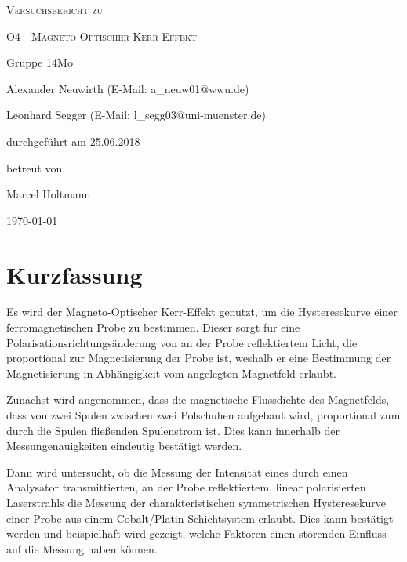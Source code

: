 \documentclass[
	a4paper,
	12pt,
	pagesize,
	ngerman
]{scrartcl}
\begin{document}
	
	\begin{titlepage}
		\centering
		{\scshape\LARGE Versuchsbericht zu \par}
		\vspace{1cm}
		{\scshape\huge O4 - Magneto-Optischer Kerr-Effekt \par}
		\vspace{2.5cm}
		{\LARGE Gruppe 14Mo \par}
		\vspace{0.5cm}
		
		{\large Alexander Neuwirth (E-Mail: a\_neuw01@wwu.de) \par}
		{\large Leonhard Segger (E-Mail: l\_segg03@uni-muenster.de) \par}
		\vfill
		
		durchgeführt am 25.06.2018\par
		betreut von\par
		{\large Marcel Holtmann}
		
		\vfill
		
		{\large \today\par}
	\end{titlepage}
	\tableofcontents
	\newpage

	\section{Kurzfassung}
	Es wird der Magneto-Optischer Kerr-Effekt genutzt, um die Hysteresekurve einer ferromagnetischen Probe zu bestimmen.
	Dieser sorgt für eine Polarisationsrichtungsänderung von an der Probe reflektiertem Licht, die proportional zur Magnetisierung der Probe ist, weshalb er eine Bestimmung der Magnetisierung in Abhängigkeit vom angelegten Magnetfeld erlaubt.
	
	Zunächst wird angenommen, dass die magnetische Flussdichte des Magnetfelds, dass von zwei Spulen zwischen zwei Polschuhen aufgebaut wird, proportional zum durch die Spulen fließenden Spulenstrom ist.
	Dies kann innerhalb der Messungenauigkeiten eindeutig bestätigt werden.
	
	Dann wird untersucht, ob die Messung der Intensität eines durch einen Analysator transmittierten, an der Probe reflektiertem, linear polarisierten Laserstrahls die Messung der charakteristischen symmetrischen Hysteresekurve einer Probe aus einem Cobalt/Platin-Schichtsystem erlaubt.
	Dies kann bestätigt werden und beispielhaft wird gezeigt, welche Faktoren einen störenden Einfluss auf die Messung haben können. %
	
\end{document}
